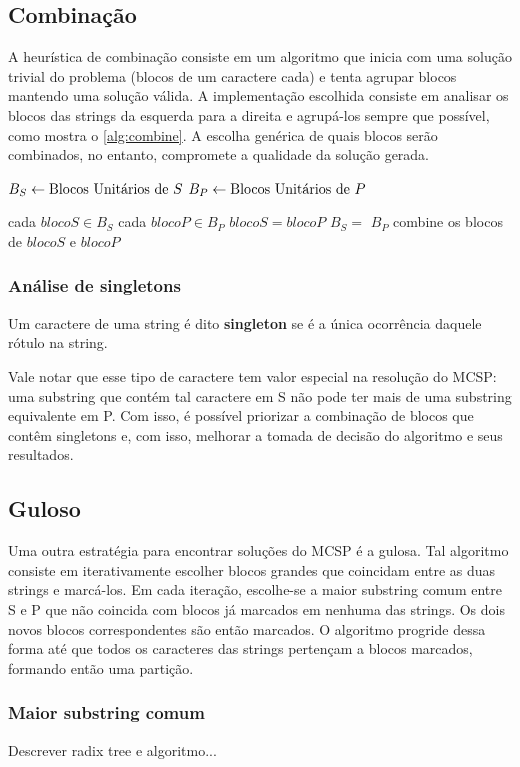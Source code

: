 
\subsection{Combinação}

    A heurística de combinação consiste em um algoritmo que inicia com uma solução trivial do problema (blocos de um caractere cada) e tenta agrupar blocos mantendo uma solução válida. A implementação escolhida consiste em analisar os blocos das strings da esquerda para a direita e agrupá-los sempre que possível, como mostra o \cref{alg:combine}. A escolha genérica de quais blocos serão combinados, no entanto, compromete a qualidade da solução gerada.

    \begin{codebox}
      \label{alg:combine}

    \li $B_S \leftarrow \text{Blocos Unitários de } S$
    \li $B_P \leftarrow \text{Blocos Unitários de } P$

    \li \Para cada $blocoS \in B_S$ \Faca
        \Do
    \li     \Para cada $blocoP \in B_P$ \Faca
            \Do
    \li         \Se $blocoS = blocoP$  $B_S = $  $B_P$ \Do
    \li             \Entao combine os blocos de $blocoS$ e $blocoP$
            \End
        \End
    \end{codebox}

    \subsubsection{Análise de singletons}
    
        \begin{definition}
            Um caractere de uma string é dito \textbf{singleton} se é a única ocorrência daquele rótulo na string.
        \end{definition}

         Vale notar que esse tipo de caractere tem valor especial na resolução do MCSP: uma substring que contém tal caractere em S não pode ter mais de uma substring equivalente em P. Com isso, é possível priorizar a combinação de blocos que contêm singletons e, com isso, melhorar a tomada de decisão do algoritmo e seus resultados.

\subsection{Guloso}

    Uma outra estratégia para encontrar soluções do MCSP é a gulosa. Tal algoritmo consiste em iterativamente escolher blocos grandes que coincidam entre as duas strings e marcá-los. Em cada iteração, escolhe-se a maior substring comum entre S e P que não coincida com blocos já marcados em nenhuma das strings. Os dois novos blocos correspondentes são então marcados. O algoritmo progride dessa forma até que todos os caracteres das strings pertençam a blocos marcados, formando então uma partição.

    \subsubsection{Maior substring comum}

        Descrever radix tree e algoritmo...
